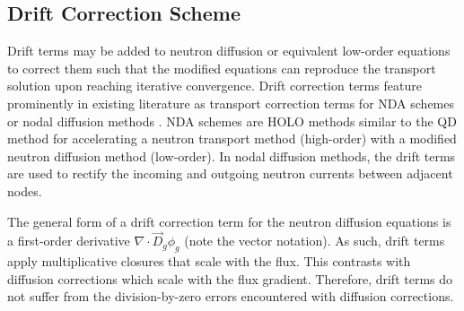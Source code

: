 \subsection{Drift Correction Scheme} \label{sec:drift-correction}

Drift terms may be added to neutron diffusion or equivalent low-order equations to correct them
such that the modified equations can reproduce the transport solution upon reaching iterative
convergence. Drift correction terms feature prominently in existing literature as transport
correction terms for \gls{NDA} schemes or nodal diffusion methods
\cite{smith_nodal_1983, smith_assembly_1986, adams_fast_2002, wang_diffusion_2014}. \gls{NDA}
schemes are \gls{HOLO} methods \cite{chacon_multiscale_2017} similar to the \gls{QD} method for
accelerating a neutron transport
method (high-order) with a modified neutron diffusion method (low-order). In nodal
diffusion methods, the drift terms are used to rectify the incoming and outgoing neutron
currents between adjacent nodes.

The general form of a drift correction term for the neutron diffusion equations is a
first-order derivative $\nabla\cdot \vec{D}_g\phi_g$ (note the vector notation). As such,
drift terms apply
multiplicative closures that scale with the flux. This contrasts with diffusion
corrections which scale with the flux gradient. Therefore, drift terms do not suffer from
the division-by-zero errors encountered with diffusion corrections.

